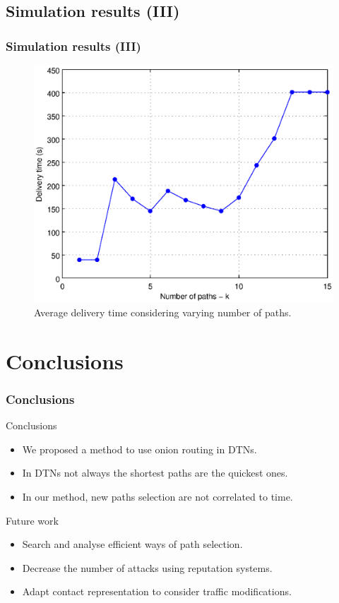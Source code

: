 \documentclass[compress,red]{beamer}
\begin{document}
\subsection{Simulation results (III)}
\begin{frame}
\frametitle{Simulation results (III)}
\begin{figure}
\centering \includegraphics[width=.7\linewidth]{../paper/imgs/statistics/ktime-data}
\caption{Average delivery time considering varying number of paths.}
\end{figure}
\end{frame}

\section{Conclusions}
\begin{frame}
\frametitle{Conclusions}
\begin{block}{Conclusions}
\begin{itemize}
\item We proposed a method to use onion routing in DTNs.
\item In DTNs not always the shortest paths are the quickest ones.
\item In our method, new paths selection are not correlated to time.
\end{itemize}
\end{block}
\bigskip
\begin{block}{Future work}
\begin{itemize}
\item Search and analyse efficient ways of path selection.
\item Decrease the number of attacks using reputation systems.
\item Adapt contact representation to consider traffic modifications. %
\end{itemize}
\end{block}
\end{frame}
\end{document}
